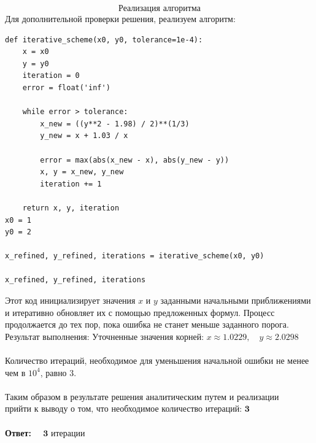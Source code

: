 \documentclass{article}
\begin{document}
$$\textbf{Реализация алгоритма}$$
Для дополнительной проверки решения, реализуем алгоритм:
\begin{lstlisting}
def iterative_scheme(x0, y0, tolerance=1e-4):
    x = x0
    y = y0
    iteration = 0
    error = float('inf')
    
    while error > tolerance:
        x_new = ((y**2 - 1.98) / 2)**(1/3)
        y_new = x + 1.03 / x
        
        error = max(abs(x_new - x), abs(y_new - y))
        x, y = x_new, y_new
        iteration += 1
        
    return x, y, iteration
x0 = 1
y0 = 2

x_refined, y_refined, iterations = iterative_scheme(x0, y0)

x_refined, y_refined, iterations

\end{lstlisting}
Этот код инициализирует значения \(x\) и \(y\) заданными начальными приближениями и итеративно обновляет их с помощью предложенных формул. Процесс продолжается до тех пор, пока ошибка не станет меньше заданного порога.
Результат выполнения:
Уточненные значения корней: $x \approx 1.0229, \quad y \approx 2.0298$\\\\
Количество итераций, необходимое для уменьшения начальной ошибки не менее чем в \(10^4\), равно \(3\).\\\\
$\textbf{Таким образом в результате решения аналитическим путем и реализации программы можно}$
$\textbf{прийти к выводу о том, что необходимое количество итераций: 3}$\\\\
\textbf{Ответ: $\quad  \textbf{3 итерации}$}
\end{document}
